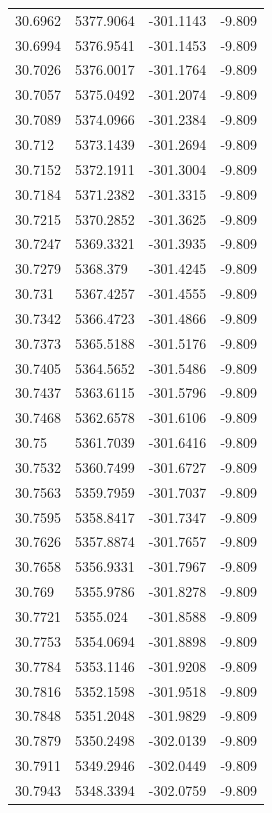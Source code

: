 \begin{table}[H]
\begin{tabular}{llll}
30.6962 & 5377.9064 & -301.1143 & -9.809 \\
30.6994 & 5376.9541 & -301.1453 & -9.809 \\
30.7026 & 5376.0017 & -301.1764 & -9.809 \\
30.7057 & 5375.0492 & -301.2074 & -9.809 \\
30.7089 & 5374.0966 & -301.2384 & -9.809 \\
30.712 & 5373.1439 & -301.2694 & -9.809 \\
30.7152 & 5372.1911 & -301.3004 & -9.809 \\
30.7184 & 5371.2382 & -301.3315 & -9.809 \\
30.7215 & 5370.2852 & -301.3625 & -9.809 \\
30.7247 & 5369.3321 & -301.3935 & -9.809 \\
30.7279 & 5368.379 & -301.4245 & -9.809 \\
30.731 & 5367.4257 & -301.4555 & -9.809 \\
30.7342 & 5366.4723 & -301.4866 & -9.809 \\
30.7373 & 5365.5188 & -301.5176 & -9.809 \\
30.7405 & 5364.5652 & -301.5486 & -9.809 \\
30.7437 & 5363.6115 & -301.5796 & -9.809 \\
30.7468 & 5362.6578 & -301.6106 & -9.809 \\
30.75 & 5361.7039 & -301.6416 & -9.809 \\
30.7532 & 5360.7499 & -301.6727 & -9.809 \\
30.7563 & 5359.7959 & -301.7037 & -9.809 \\
30.7595 & 5358.8417 & -301.7347 & -9.809 \\
30.7626 & 5357.8874 & -301.7657 & -9.809 \\
30.7658 & 5356.9331 & -301.7967 & -9.809 \\
30.769 & 5355.9786 & -301.8278 & -9.809 \\
30.7721 & 5355.024 & -301.8588 & -9.809 \\
30.7753 & 5354.0694 & -301.8898 & -9.809 \\
30.7784 & 5353.1146 & -301.9208 & -9.809 \\
30.7816 & 5352.1598 & -301.9518 & -9.809 \\
30.7848 & 5351.2048 & -301.9829 & -9.809 \\
30.7879 & 5350.2498 & -302.0139 & -9.809 \\
30.7911 & 5349.2946 & -302.0449 & -9.809 \\
30.7943 & 5348.3394 & -302.0759 & -9.809 \\

\end{tabular}
\end{table}
